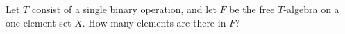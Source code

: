 Let $T$ consist of a single binary operation, and let $F$ be the free $T$-algebra on a one-element set $X$. How many elements are there in $F$?
